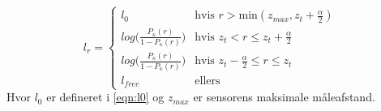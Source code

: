 \begin{equation}
	l_{r} = \begin{cases} 
		l_0 &\text{hvis }r > \text{min}(z_{max},z_t+\frac{\alpha}{2}) \\
		log\Big(\frac{P_\kappa(r)}{1-P_\kappa(r)}\Big) &\text{hvis } z_t < r \leq z_t+\frac{\alpha}{2} \\
		log\Big(\frac{P_\kappa(r)}{1-P_\kappa(r)}\Big) &\text{hvis } z_t-\frac{\alpha}{2} \leq r \leq z_t \\
		l_{free} &\text{ellers}	
	\end{cases} 
\end{equation}
Hvor $l_0$ er defineret i \cref{eqn:l0} og $z_{max}$ er sensorens maksimale måleafstand.



%
%
%
%
%
%
%
%
%
%
%
%
%
%
%
%
%
%














\
